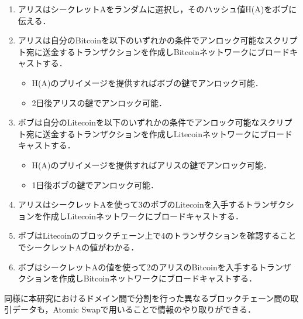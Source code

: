 \documentclass[a4paper,12pt]{jsarticle}
\begin{document}
\begin{enumerate}
  \item アリスはシークレットAをランダムに選択し，そのハッシュ値H(A)をボブに伝える．
  \item アリスは自分のBitcoinを以下のいずれかの条件でアンロック可能なスクリプト宛に送金するトランザクションを作成しBitcoinネットワークにブロードキャストする．
%
  \begin{itemize}
    \item H(A)のプリイメージを提供すればボブの鍵でアンロック可能．
    \item 2日後アリスの鍵でアンロック可能．
  \end{itemize} 
  \item ボブは自分のLitecoinを以下のいずれかの条件でアンロック可能なスクリプト宛に送金するトランザクションを作成しLitecoinネットワークにブロードキャストする．
%
  \begin{itemize}
    \item H(A)のプリイメージを提供すればアリスの鍵でアンロック可能．
    \item 1日後ボブの鍵でアンロック可能．
  \end{itemize}
%
  \item アリスはシークレットAを使って3のボブのLitecoinを入手するトランザクションを作成しLitecoinネットワークにブロードキャストする．
  \item ボブはLitecoinのブロックチェーン上で4のトランザクションを確認することでシークレットAの値がわかる．
  \item ボブはシークレットAの値を使って2のアリスのBitcoinを入手するトランザクションを作成しBitcoinネットワークにブロードキャストする．
\end{enumerate}

同様に本研究におけるドメイン間で分割を行った異なるブロックチェーン間の取引データも，Atomic Swapで用いることで情報のやり取りができる．
\end{document}

